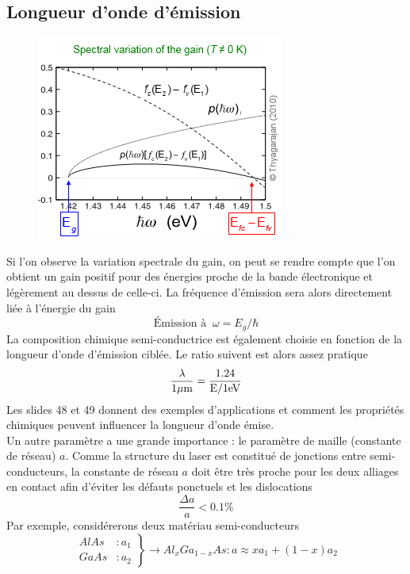 	\subsection{Longueur d'onde d'émission}	
	\begin{figure}
	\vspace{-5mm}
	\includegraphics[scale=0.8]{ch5/image34}
	\end{figure}
	Si l'on observe la variation spectrale du gain, on peut se rendre compte que l'on obtient un 
	gain positif pour des énergies proche de la bande électronique et légèrement au dessus de 
	celle-ci. La fréquence d'émission sera alors directement liée à l'énergie du gain
	\begin{equation}
	\text{Émission à }\ \omega = E_g/\hbar
	\end{equation}
	La composition chimique semi-conductrice est également choisie en fonction de la longueur d'onde 
	d'émission ciblée. Le ratio suivent est alors assez pratique
	\begin{equation}
	\frac{\lambda }{{1{\rm{ }}\mu {\rm{m}}}} = \frac{{1.24}}{{{\rm{E/1 eV}}}}
	\end{equation}
	Les slides 48 et 49 donnent des exemples d'applications et comment les propriétés chimiques 
	peuvent influencer la longueur d'onde émise.\\
	
	Un autre paramètre a une grande importance : le paramètre de maille (constante de réseau) $a$.
	Comme la structure du 	laser est constitué de jonctions entre semi-conducteurs, la constante de
	réseau $a$ doit être très proche pour les deux alliages en contact afin d'éviter les défauts 
	ponctuels et les dislocations 
	\begin{equation}
	\dfrac{\Delta a}{a} < 0.1\%
	\end{equation}
	Par exemple, considérerons deux matériau semi-conducteurs
	\begin{equation}
	\left.\begin{array}{ll}
	AlAs &: a_1\\
	GaAs &: a_2
	\end{array}\right\} \to Al_xGa_{1-x}As: a \approx xa_1+(1-x)a_2
	\end{equation}
	


